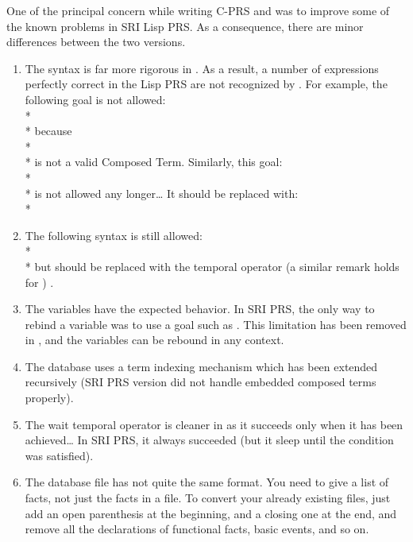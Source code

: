 One of the principal concern while writing C-PRS and \COPRS{} was to
improve some of the known problems in SRI Lisp PRS. As a consequence, there
are minor differences between the two versions.

\begin{enumerate}

\item The syntax is far more rigorous in \COPRS{}. As a result, a
number of expressions perfectly correct in the Lisp PRS are not
recognized by \COPRS{}. For example, the following goal is not allowed: \\*
 \\*
because \\*
 \\*
is not a valid Composed Term. Similarly, this goal: \\*
 \\*
is not allowed any longer\dots{} It should be replaced with: \\*

\item The following syntax is still allowed: \\*
 \\*
but should be replaced with the \code{=>} temporal operator (a similar
remark holds for \code{~>}) .

\item The  variables have the expected behavior. In SRI PRS, the
only way to rebind a variable was to use a goal such as . This limitation has been removed in \COPRS{}, and the 
variables can be rebound in any context.

\item The database uses a term indexing mechanism which has been extended
recursively (SRI PRS version did not handle embedded composed terms
properly).

\item The wait temporal operator is cleaner in \COPRS{} as it succeeds only
when it has been achieved\dots{} In SRI PRS, it always succeeded (but it
sleep until the condition was satisfied).

\item The database file has not quite the same format. You need to give a
list of facts, not just the facts in a file. To convert your already
existing files, just add an open parenthesis at the beginning, and a
closing one at the end, and remove all the declarations of functional
facts, basic events, and so on.


\end{enumerate}

